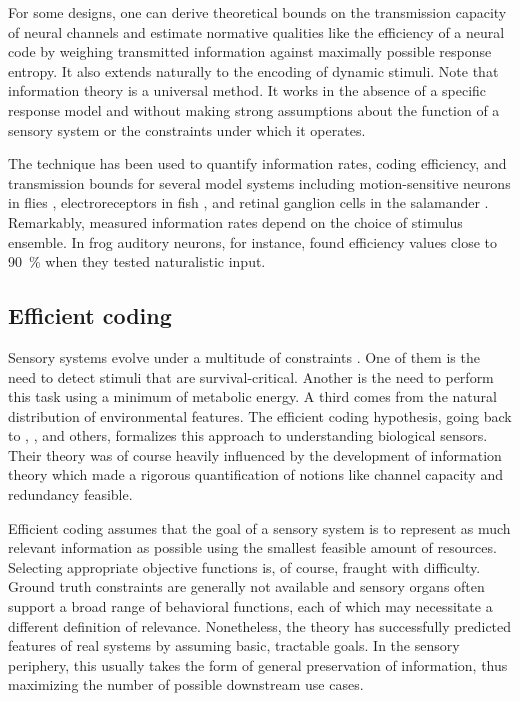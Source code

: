 For some designs, one can derive theoretical bounds on the transmission capacity of neural channels and estimate normative qualities like the efficiency of a neural code by weighing transmitted information against maximally possible response entropy. It also extends naturally to the encoding of dynamic stimuli. Note that information theory is a universal method. It works in the absence of a specific response model and without making strong assumptions about the function of a sensory system or the constraints under which it operates.

The technique has been used to quantify information rates, coding efficiency, and transmission bounds for several model systems including motion-sensitive neurons in flies \citep{Bialek:1991aa,vanSteveninck:1997aa,Haag:1998wr,Weber:2012dr}, electroreceptors in fish \citep{Wessel:1996aa}, and retinal ganglion cells in the salamander \citep{Warland:1997aa}. Remarkably, measured information rates depend on the choice of stimulus ensemble. In frog auditory neurons, for instance, \citet{Rieke:1995aa} found efficiency values close to \SI{90}{\percent} when they tested naturalistic input.

\subsection{Efficient coding}
Sensory systems evolve under a multitude of constraints \citep{Sterling:2015aa}. One of them is the need to detect stimuli that are survival-critical. Another is the need to perform this task using a minimum of metabolic energy. A third comes from the natural distribution of environmental features. The efficient coding hypothesis, going back to \citet{Attneave:1954aa}, \citet{Barlow:1961aa}, and others, formalizes this approach to understanding biological sensors. Their theory was of course heavily influenced by the development of information theory which made a rigorous quantification of notions like channel capacity and redundancy feasible.

Efficient coding assumes that the goal of a sensory system is to represent as much relevant information as possible using the smallest feasible amount of resources. Selecting appropriate objective functions is, of course, fraught with difficulty. Ground truth constraints are generally not available and sensory organs often support a broad range of behavioral functions, each of which may necessitate a different definition of relevance. Nonetheless, the theory has successfully predicted features of real systems by assuming basic, tractable goals. In the sensory periphery, this usually takes the form of general preservation of information, thus maximizing the number of possible downstream use cases.

